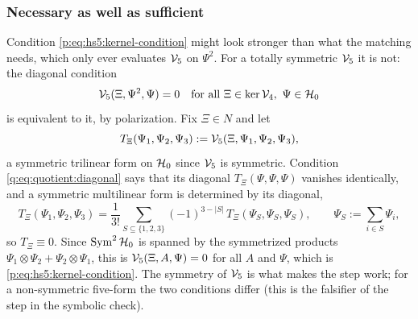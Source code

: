 \subsubsection{Necessary as well as sufficient}
\label{q:sec:quotient:necessary}

Condition \eqref{p:eq:hs5:kernel-condition} might look stronger than what the matching needs, which only ever evaluates ${\mathcal{V}}_5$ on $\Psi^2$.
For a totally symmetric ${\mathcal{V}}_5$ it is not: the diagonal condition
\begin{equation}
  \label{q:eq:quotient:diagonal}
  {\mathcal{V}}_5(\Xi, \Psi^2, \Psi) = 0
  \quad\text{for all } \Xi \in \ker {\mathcal{V}}_4,\ \Psi \in {\mathcal{H}}_0
\end{equation}
is equivalent to it, by polarization.
Fix $\Xi\in N$ and let
\begin{equation}
  T_\Xi(\Psi_1, \Psi_2, \Psi_3)
    := {\mathcal{V}}_5(\Xi, \Psi_1, \Psi_2, \Psi_3),
\end{equation}
a symmetric trilinear form on ${\mathcal{H}}_0$ since ${\mathcal{V}}_5$ is symmetric.
Condition \eqref{q:eq:quotient:diagonal} says that its diagonal $T_\Xi(\Psi,\Psi,\Psi)$ vanishes identically, and a symmetric multilinear form is determined by its diagonal,
\begin{equation}
  T_\Xi(\Psi_1, \Psi_2, \Psi_3)
    = \frac{1}{3!} \sum_{S \subseteq \{1, 2, 3\}} (-1)^{3 - |S|} \, T_\Xi(\Psi_S, \Psi_S, \Psi_S),
  \qquad
  \Psi_S := \sum_{i \in S} \Psi_i ,
\end{equation}
so $T_\Xi\equiv0$.
Since $\operatorname{Sym}^2{\mathcal{H}}_0$ is spanned by the symmetrized products $\Psi_1\otimes\Psi_2+\Psi_2\otimes\Psi_1$, this is ${\mathcal{V}}_5(\Xi,A,\Psi)=0$ for all $A$ and $\Psi$, which is \eqref{p:eq:hs5:kernel-condition}.
The symmetry of ${\mathcal{V}}_5$ is what makes the step work; for a non-symmetric five-form the two conditions differ (this is the falsifier of the step in the symbolic check).

